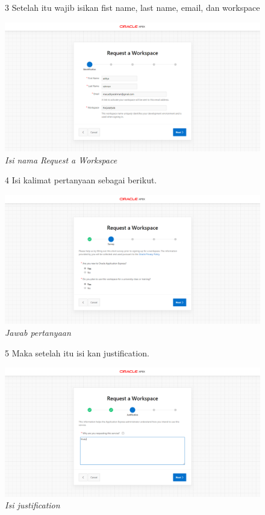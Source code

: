 \begin{enumerate}
\begin{figure}[!htbp]
\item[3] Setelah itu wajib isikan fist name, last name, email, dan workspace
	\begin{center}
	\includegraphics[scale=0.2]{figures/tahap2.png}
    \caption{\textit{Isi nama Request a Workspace}}
    \end{center}
\end{figure}

\begin{figure}[!htbp]
\item[4] Isi kalimat pertanyaan sebagai berikut.
	\begin{center}
	\includegraphics[scale=0.2]{figures/tahap3.png}
	\caption{\textit{Jawab pertanyaan}}
	\end{center}	 
\end{figure}

\begin{figure}[!htbp]
\item[5] Maka setelah itu isi kan justification.
	\begin{center}
	\includegraphics[scale=0.2]{figures/tahap4.png}
	\caption{\textit{Isi justification}}
	\end{center}	 
\end{figure}


\end{enumerate}
